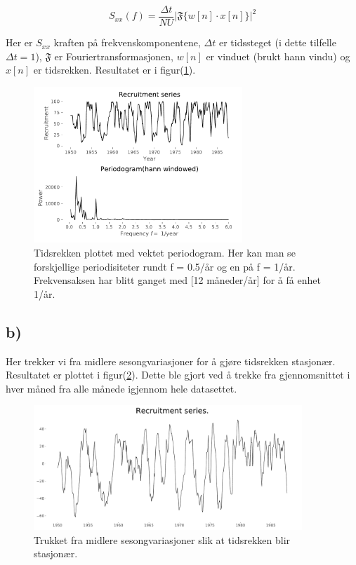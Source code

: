 \begin{equation}
    S_{xx}(f) = \frac{\Delta t}{NU}\bigg |\mathfrak{F}\bigg\{w[n]\cdot x[n]\bigg\}\bigg |^{2}
    \label{vektet periodogram}
\end{equation}

Her er $S_{xx}$ kraften på frekvenskomponentene, $\Delta t$ er tidssteget (i dette tilfelle $\Delta t = 1$), $\mathfrak{F}$ er Fouriertransformasjonen, $w[n]$ er vinduet (brukt hann vindu) og $x[n]$ er tidsrekken. Resultatet er i figur(\ref{task_a}).

\begin{figure}[hbt!]
{\centering
    \includegraphics[width=0.70\textwidth]{task_a.pdf}
    \caption{Tidsrekken plottet med vektet periodogram. Her kan man se forskjellige periodisiteter rundt f = 0.5/år og en på f = 1/år. Frekvensaksen har blitt ganget med [12 måneder/år] for å få enhet 1/år.}
    \label{task_a}
\par}
\end{figure}


\subsection{b)}

Her trekker vi fra midlere sesongvariasjoner for å gjøre tidsrekken stasjonær. Resultatet er plottet i figur(\ref{task_b}). Dette ble gjort ved å trekke fra gjennomsnittet i hver måned fra alle månede igjennom hele datasettet.

\begin{figure}[hbt!]
    {\centering
        \includegraphics[width=0.90\textwidth]{task_b.pdf}
        \caption{Trukket fra midlere sesongvariasjoner slik at tidsrekken blir stasjonær.}
        \label{task_b}
    \par}
    \end{figure}


